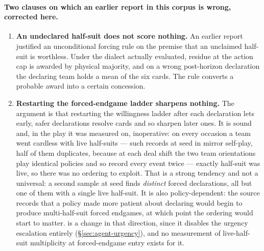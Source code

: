 \paragraph{Two clauses on which an earlier report in this corpus is wrong, corrected here.}

\begin{enumerate}
\item \textbf{An undeclared half-suit does not score nothing.} An earlier report justified an
  unconditional forcing rule on the premise that an unclaimed half-suit is worthless. Under the
  dialect actually evaluated, residue at the action cap is awarded by physical majority, and on a
  wrong post-horizon declaration the declaring team holds a mean \numResidueHeld{} of the six cards.
  The rule converts a probable award into a certain concession.
\item \textbf{Restarting the forced-endgame ladder sharpens nothing.} The argument is that restarting
  the willingness ladder after each declaration lets early, safer declarations resolve cards and so
  sharpen later ones. It is sound and, in the play it was measured on, inoperative: on every occasion
  a team went cardless with live half-suits --- \numLadderOccasions{} such records at seed
  \numLadderSeed{} in \vfour{} mirror self-play, half of them duplicates, because at each deal shift
  the two team orientations play identical policies and so record every event twice ---
  exactly \numLadderLiveSets{} half-suit was live,
  so there was no ordering to exploit. That is a strong tendency and not a universal: a second
  sample at seed \vsevenLadderSecondSeed{} finds \vsevenLadderSecondTotal{} \emph{distinct} forced
  declarations, all but one of them with a single live half-suit. It is also
  policy-dependent: the source
  records that a policy made more patient about declaring would begin to produce multi-half-suit
  forced endgames, at which point the ordering would start to matter. \sestina{} is a change in
  that direction, since it disables the urgency escalation entirely
  (\S\ref{sec:agent-urgency}), and no measurement of live-half-suit multiplicity at forced-endgame
  entry exists for it.
\end{enumerate}
